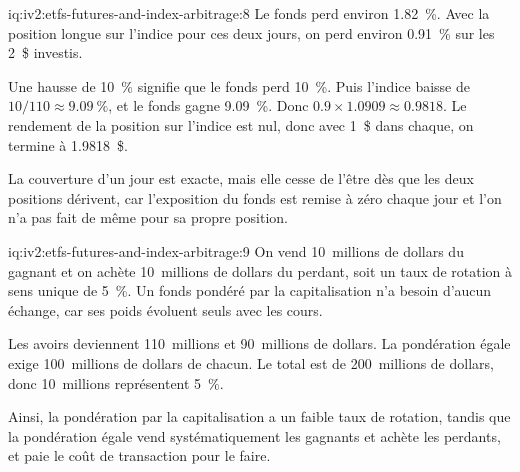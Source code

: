 \begin{solution}{iq:iv2:etfs-futures-and-index-arbitrage:8}
Le fonds perd environ 1.82~\%. Avec la position longue sur l'indice pour ces deux jours, on perd environ 0.91~\% sur les 2~\$ investis.

Une hausse de 10~\% signifie que le fonds perd 10~\%. Puis l'indice baisse de $10/110 \approx 9.09~\%$, et le fonds gagne 9.09~\%. Donc $0.9 \times 1.0909 \approx 0.9818$. Le rendement de la position sur l'indice est nul, donc avec 1~\$ dans chaque, on termine à 1.9818~\$.

La couverture d'un jour est exacte, mais elle cesse de l'être dès que les deux positions dérivent, car l'exposition du fonds est remise à zéro chaque jour et l'on n'a pas fait de même pour sa propre position.

\end{solution}

\begin{solution}{iq:iv2:etfs-futures-and-index-arbitrage:9}
On vend 10~millions de dollars du gagnant et on achète 10~millions de dollars du perdant, soit un taux de rotation à sens unique de 5~\%. Un fonds pondéré par la capitalisation n'a besoin d'aucun échange, car ses poids évoluent seuls avec les cours.

Les avoirs deviennent 110~millions et 90~millions de dollars. La pondération égale exige 100~millions de dollars de chacun. Le total est de 200~millions de dollars, donc 10~millions représentent 5~\%.

Ainsi, la pondération par la capitalisation a un faible taux de rotation, tandis que la pondération égale vend systématiquement les gagnants et achète les perdants, et paie le coût de transaction pour le faire.

\end{solution}

